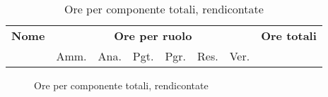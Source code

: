 \begin{table}[H]
\centering
\begin{tabular}{lccccccc}
\toprule 
    \textbf{Nome}  & \multicolumn{6}{c}{\textbf{Ore per ruolo}} & \textbf{Ore totali}\\
     & Amm. & Ana. & Pgt. & Pgr. & Res. & Ver. \\
    \midrule

    	

    \bottomrule
\end{tabular}
\caption{Ore per componente totali, rendicontate}
\end{table}


\begin{figure}[H]
\caption{Ore per componente totali, rendicontate}
\end{figure}
